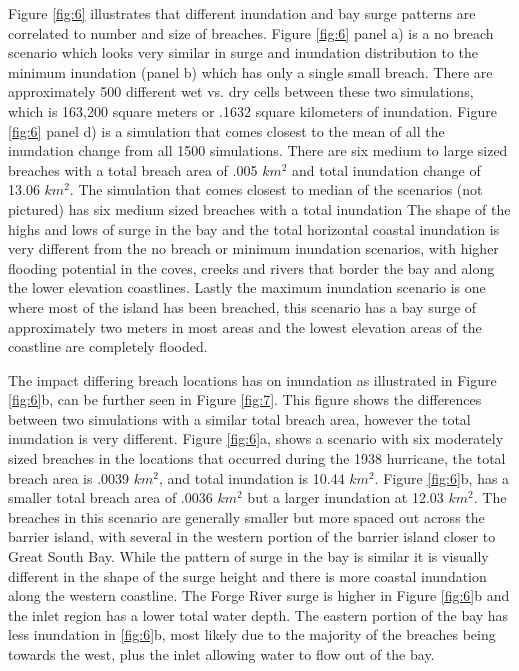 \documentclass{coastal_paper}
\begin{document}
Figure \ref{fig:6} illustrates that different inundation and bay surge patterns are correlated to number and size of breaches. Figure \ref{fig:6} panel a) is a no breach scenario which looks very similar in surge and inundation distribution to the minimum inundation (panel b) which has only a single small breach. There are approximately 500 different wet vs. dry cells between these two simulations, which is 163,200 square meters or .1632 square kilometers of inundation. Figure \ref{fig:6} panel d) is a simulation that comes closest to the mean of all the inundation change from all 1500 simulations. There are six medium to large sized breaches with a total breach area of .005 $km^2$ and total inundation change of 13.06 $km^2$. The simulation that comes closest to median of the scenarios (not pictured) has six medium sized breaches with a total inundation  The shape of the highs and lows of surge in the bay and the total horizontal coastal inundation is very different from the no breach or minimum inundation scenarios, with higher flooding potential in the coves, creeks and rivers that border the bay and along the lower elevation coastlines. Lastly the maximum inundation scenario is one where most of the island has been breached, this scenario has a bay surge of approximately two meters in most areas and the lowest elevation areas of the coastline are completely flooded.

The impact differing breach locations has on inundation as illustrated in Figure \ref{fig:6}b, can be further seen in Figure \ref{fig:7}. This figure shows the differences between two simulations with a similar total breach area, however the total inundation is very different. Figure \ref{fig:6}a, shows a scenario with six moderately sized breaches in the locations that occurred during the 1938 hurricane, the total breach area is .0039 $km^2$, and total inundation is 10.44 $km^2$. Figure \ref{fig:6}b, has a smaller total breach area of .0036 $km^2$ but a larger inundation at 12.03 $km^2$. The breaches in this scenario are generally smaller but more spaced out across the barrier island, with several in the western portion of the barrier island closer to Great South Bay. While the pattern of surge in the bay is similar it is visually different in the shape of the surge height and there is more coastal inundation along the western coastline. The Forge River surge is higher in Figure \ref{fig:6}b and the inlet region has a lower total water depth. The eastern portion of the bay has less inundation in \ref{fig:6}b, most likely due to the majority of the breaches being towards the west, plus the inlet allowing water to flow out of the bay.
\end{document}
